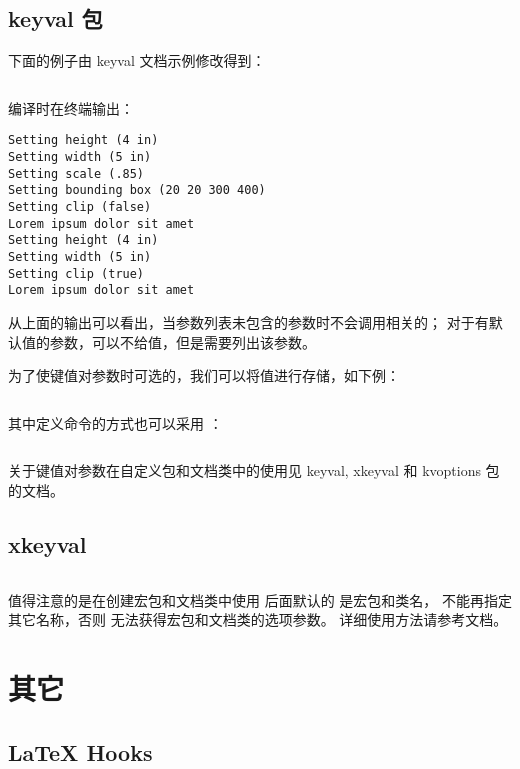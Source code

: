 \subsection{ keyval 包}

下面的例子由 keyval 文档示例修改得到：

\inputminted[linenos]{latex}{examples/programming/keyval-command-with-parameters.tex}

编译时在终端输出：

\begin{verbatim}
Setting height (4 in)
Setting width (5 in)
Setting scale (.85)
Setting bounding box (20 20 300 400)
Setting clip (false)
Lorem ipsum dolor sit amet
Setting height (4 in)
Setting width (5 in)
Setting clip (true)
Lorem ipsum dolor sit amet
\end{verbatim}

从上面的输出可以看出，当参数列表未包含的参数时不会调用相关的；
对于有默认值的参数，可以不给值，但是需要列出该参数。

为了使键值对参数时可选的，我们可以将值进行存储，如下例：

\inputminted[linenos]{latex}{examples/programming/keyval-command-with-optional-parameters1.tex}

其中定义命令的方式也可以采用 ：

\inputminted[firstline=30,lastline=42]{latex}{examples/programming/keyval-command-with-optional-parameters2.tex}

关于键值对参数在自定义包和文档类中的使用见 keyval, xkeyval 和 kvoptions 包的文档。

\subsection{xkeyval}

\inputminted{latex}{examples/programming/xkeyval-command-with-optional-parameters.tex}
 
值得注意的是在创建宏包和文档类中使用  后面默认的 是宏包和类名，
不能再指定其它名称，否则  无法获得宏包和文档类的选项参数。
详细使用方法请参考文档。

\section{其它}

\subsection{{\LaTeX} Hooks}

